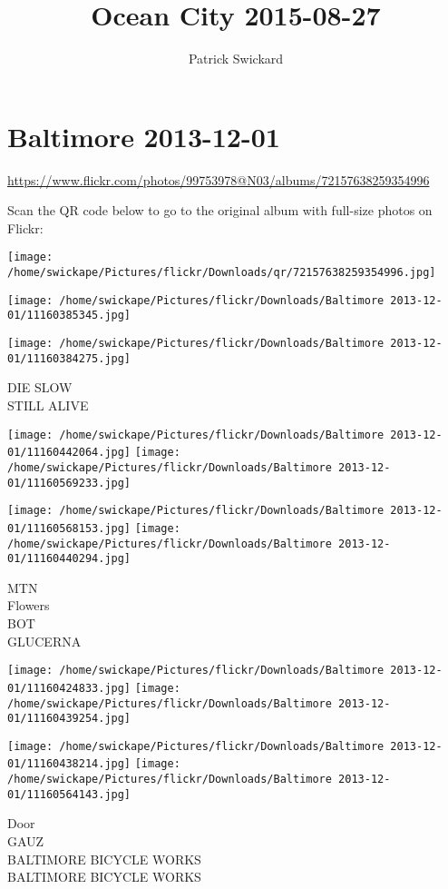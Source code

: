 \documentclass[10pt,letterpaper]{article}
\title{Ocean City 2015-08-27}
\author{Patrick Swickard}
\date{}
\begin{document}
\section*{Baltimore 2013-12-01}

\url{https://www.flickr.com/photos/99753978@N03/albums/72157638259354996}

Scan the QR code below to go to the original album with full-size photos on Flickr:

\texttt{[image: /home/swickape/Pictures/flickr/Downloads/qr/72157638259354996.jpg]}
\pagebreak

\texttt{[image: /home/swickape/Pictures/flickr/Downloads/Baltimore 2013-12-01/11160385345.jpg]}

\vspace{0.25in}
\texttt{[image: /home/swickape/Pictures/flickr/Downloads/Baltimore 2013-12-01/11160384275.jpg]}

DIE SLOW\\
STILL ALIVE
\pagebreak

\texttt{[image: /home/swickape/Pictures/flickr/Downloads/Baltimore 2013-12-01/11160442064.jpg]}
\texttt{[image: /home/swickape/Pictures/flickr/Downloads/Baltimore 2013-12-01/11160569233.jpg]}

\texttt{[image: /home/swickape/Pictures/flickr/Downloads/Baltimore 2013-12-01/11160568153.jpg]}
\texttt{[image: /home/swickape/Pictures/flickr/Downloads/Baltimore 2013-12-01/11160440294.jpg]}

MTN\\
Flowers\\
BOT\\
GLUCERNA
\pagebreak

\texttt{[image: /home/swickape/Pictures/flickr/Downloads/Baltimore 2013-12-01/11160424833.jpg]}
\texttt{[image: /home/swickape/Pictures/flickr/Downloads/Baltimore 2013-12-01/11160439254.jpg]}

\texttt{[image: /home/swickape/Pictures/flickr/Downloads/Baltimore 2013-12-01/11160438214.jpg]}
\texttt{[image: /home/swickape/Pictures/flickr/Downloads/Baltimore 2013-12-01/11160564143.jpg]}

Door\\
GAUZ\\
BALTIMORE BICYCLE WORKS\\
BALTIMORE BICYCLE WORKS
\pagebreak
\end{document}

